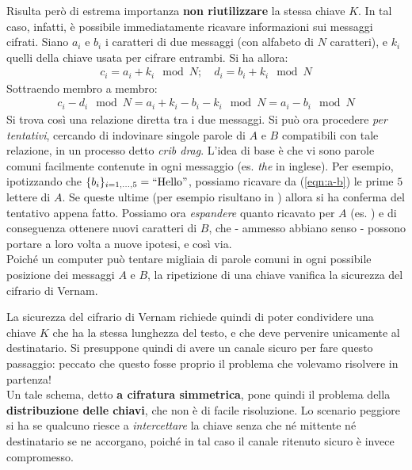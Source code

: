 \documentclass[../../InformazioneQuantistica.tex]{subfiles}
\begin{document}
\begin{expl}
Risulta però di estrema importanza \textbf{non riutilizzare} la stessa chiave $K$. In tal caso, infatti, è possibile immediatamente ricavare informazioni sui messaggi cifrati. Siano $a_i$ e $b_i$ i caratteri di due messaggi (con alfabeto di $N$ caratteri), e $k_i$ quelli della chiave usata per cifrare entrambi. Si ha allora:
\begin{align*}
c_i = a_i + k_i \mod N; \quad d_i = b_i + k_i \mod N
\end{align*}
Sottraendo membro a membro:
\begin{align}
c_i - d_i \mod N = a_i + k_i -b_i -k_i \mod N = a_i-b_i \mod N
\label{eqn:a-b}
\end{align}
Si trova così una relazione diretta tra i due messaggi. Si può ora procedere \textit{per tentativi}, cercando di indovinare singole parole di $A$ e $B$ compatibili con tale relazione, in un processo detto \textit{crib drag}. L'idea di base è che vi sono parole comuni  facilmente  contenute in ogni messaggio (es. \textit{the} in inglese). Per esempio, ipotizzando che $\{b_{i}\}_{i=1,\dots,5} = \text{``Hello''}$, possiamo ricavare da (\ref{eqn:a-b}) le prime $5$ lettere di $A$. Se queste ultime  (per esempio risultano in ) allora si ha conferma del tentativo appena fatto. Possiamo ora \textit{espandere} quanto ricavato per $A$ (es. ) e di conseguenza ottenere nuovi caratteri di $B$, che - ammesso abbiano senso - possono portare a loro volta a nuove ipotesi, e così via.\\
Poiché un computer può tentare migliaia di parole comuni in ogni possibile posizione dei messaggi $A$ e $B$, la ripetizione di una chiave vanifica la sicurezza del cifrario di Vernam.
\end{expl}

La sicurezza del cifrario di Vernam richiede quindi di poter condividere una chiave $K$ che ha la stessa lunghezza del testo, e che deve pervenire unicamente al destinatario. Si presuppone quindi di avere un canale sicuro per fare questo passaggio: peccato che questo fosse proprio il problema che volevamo risolvere in partenza!\\
Un tale schema, detto \textbf{a cifratura simmetrica}, pone quindi il problema della \textbf{distribuzione delle chiavi}, che non è di facile risoluzione. Lo scenario peggiore si ha se qualcuno riesce a \textit{intercettare} la chiave senza che né mittente né destinatario se ne accorgano, poiché in tal caso il canale ritenuto sicuro è invece compromesso.
\end{document}

